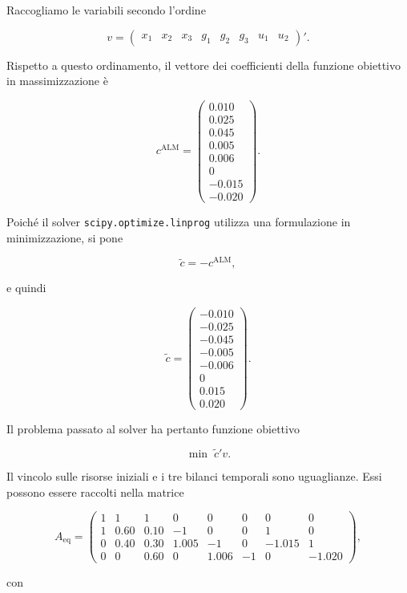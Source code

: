 \begin{enumerate}
Raccogliamo le variabili secondo l'ordine

\[
v
=
\begin{pmatrix}
x_1&
x_2&
x_3&
g_1&
g_2&
g_3&
u_1&
u_2
\end{pmatrix}'.
\]

Rispetto a questo ordinamento, il vettore dei coefficienti della funzione
obiettivo in massimizzazione \`e

\[
c^{\mathrm{ALM}}
=
\begin{pmatrix}
0.010\\
0.025\\
0.045\\
0.005\\
0.006\\
0\\
-0.015\\
-0.020
\end{pmatrix}.
\]

Poich\'e il solver \texttt{scipy.optimize.linprog} utilizza una formulazione
in minimizzazione, si pone

\[
\widetilde c
=
-c^{\mathrm{ALM}},
\]

e quindi

\[
\widetilde c
=
\begin{pmatrix}
-0.010\\
-0.025\\
-0.045\\
-0.005\\
-0.006\\
0\\
0.015\\
0.020
\end{pmatrix}.
\]

Il problema passato al solver ha pertanto funzione obiettivo

\[
\min\;\widetilde c'v.
\]

Il vincolo sulle risorse iniziali e i tre bilanci temporali sono uguaglianze.
Essi possono essere raccolti nella matrice

\[
A_{\mathrm{eq}}
=
\begin{pmatrix}
1 & 1    & 1    & 0     & 0     & 0  & 0      & 0\\
1 & 0.60 & 0.10 & -1    & 0     & 0  & 1      & 0\\
0 & 0.40 & 0.30 & 1.005 & -1    & 0  & -1.015 & 1\\
0 & 0    & 0.60 & 0     & 1.006 & -1 & 0      & -1.020
\end{pmatrix},
\]

con


\end{enumerate}
